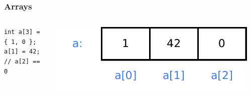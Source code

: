 \begin{frame}[fragile]
\frametitle{Arrays}
\begin{columns}[c]
  \begin{column}{0.5\textwidth}
\lstset{language=C++,numbers=left}
\begin{lstlisting}
int a[3] = { 1, 0 };
a[1] = 42;
// a[2] == 0
\end{lstlisting}
  \end{column}
  \begin{column}{0.5\textwidth}
    \includegraphics[width=0.95\textwidth]{figures/array0}
  \end{column}
\end{columns}
\end{frame}
